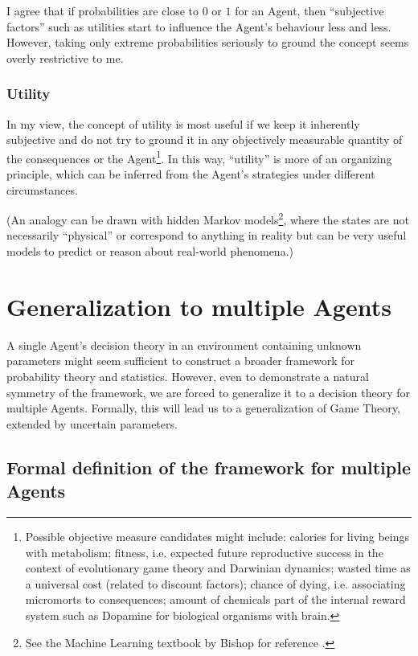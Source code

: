 \documentclass{article}
\begin{document}
I agree that if probabilities are close to $0$ or $1$ for an Agent, then ``subjective factors'' such as utilities start to influence the Agent's behaviour less and less. However, taking only extreme probabilities seriously to ground the concept seems overly restrictive to me.


\subsubsection*{Utility}

In my view, the concept of utility is most useful if we keep it inherently subjective and do not try to ground it in any objectively measurable quantity of the consequences or the Agent\footnote{Possible objective measure candidates might include: calories \cite{paper:DietSelectionAndOptimization,book:NewEcology} for living beings with metabolism; fitness, i.e. expected future reproductive success in the context of evolutionary game theory and Darwinian dynamics; wasted time as a universal cost (related to discount factors); chance of dying, i.e. associating micromorts \cite{paper:Micromorts,book:Micromorts} to consequences; amount of chemicals part of the internal reward system such as Dopamine for biological organisms with brain.}.
In this way, ``utility'' is more of an organizing principle, which can be inferred from the Agent's strategies under different circumstances.

(An analogy can be drawn with hidden Markov models\footnote{See the Machine Learning textbook by Bishop for reference \cite{book:Bishop}.}, where the states are not necessarily ``physical'' or correspond to anything in reality but can be very useful models to predict or reason about real-world phenomena.)


\section*{Generalization to multiple Agents}

A single Agent's decision theory in an environment containing unknown parameters might seem sufficient to construct a broader framework for probability theory and statistics. However, even to demonstrate a natural symmetry of the framework, we are forced to generalize it to a decision theory for multiple Agents. Formally, this will lead us to a generalization of Game Theory, extended by uncertain parameters.

\subsection*{Formal definition of the framework for multiple Agents}
\end{document}
